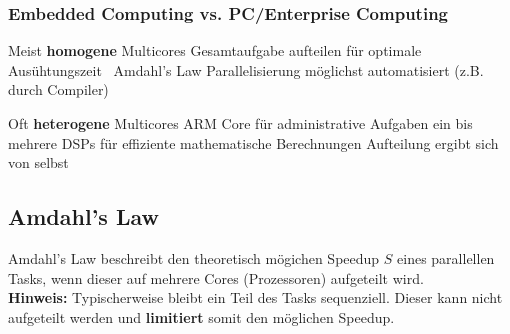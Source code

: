 \subsubsection{Embedded Computing vs. PC/Enterprise Computing}



\begin{outline}
    \1 Meist \textbf{homogene} Multicores
        \2 Gesamtaufgabe aufteilen für optimale Ausühtungszeit \textrightarrow\ Amdahl's Law
    \1 Parallelisierung möglichst automatisiert (z.B. durch Compiler)
\end{outline}


\begin{outline}
    \1 Oft \textbf{heterogene} Multicores
        \2 ARM Core für administrative Aufgaben
        \2 ein bis mehrere DSPs für effiziente mathematische Berechnungen
        \2 Aufteilung ergibt sich von selbst
\end{outline}


\subsection{Amdahl's Law}

Amdahl's Law beschreibt den theoretisch mögichen Speedup $S$ eines parallellen Tasks, wenn dieser
auf mehrere Cores (Prozessoren) aufgeteilt wird. \\
\textbf{Hinweis:} Typischerweise bleibt ein Teil des Tasks sequenziell. Dieser kann nicht aufgeteilt werden
und \textbf{limitiert} somit den möglichen Speedup.

\vspace{0.1cm}

        

